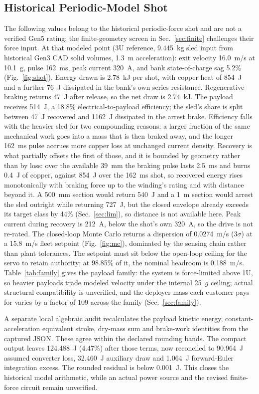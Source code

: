 \documentclass[conference]{IEEEtran}
\begin{document}
\subsection{Historical Periodic-Model Shot}
The following values belong to the historical periodic-force shot and are not a verified Gen5 rating; the finite-geometry screen in Sec.~\ref{sec:finite} challenges their force input. At that modeled point (3U reference, 9.445~kg sled input from historical Gen3 CAD solid volumes, 1.3~m acceleration): exit velocity 16.0~m/s at 10.1~g, pulse 162~ms, peak current 320~A, and bank state-of-charge sag 5.2\% (Fig.~\ref{fig:shot}). Energy drawn is 2.78~kJ per shot, with copper heat of 854~J and a further 76~J dissipated in the bank's own series resistance. Regenerative braking returns 47~J after release, so the net draw is 2.74~kJ. The payload receives 514~J, a 18.8\% electrical-to-payload efficiency; the sled's share is split between 47~J recovered and 1162~J dissipated in the arrest brake. Efficiency falls with the heavier sled for two compounding reasons: a larger fraction of the same mechanical work goes into a mass that is then braked away, and the longer 162~ms pulse accrues more copper loss at unchanged current density. Recovery is what partially offsets the first of those, and it is bounded by geometry rather than by loss: over the available 39~mm the braking pulse lasts 2.5~ms and burns 0.4~J of copper, against 854~J over the 162~ms shot, so recovered energy rises monotonically with braking force up to the winding's rating and with distance beyond it. A 500~mm section would return 540~J and a 1~m section would arrest the sled outright while returning 727~J, but the closed envelope already exceeds its target class by 44\% (Sec.~\ref{sec:lim}), so distance is not available here. Peak current during recovery is 212~A, below the shot's own 320~A, so the drive is not re-rated. The closed-loop Monte Carlo returns a dispersion of 0.0274~m/s (3$\sigma$) at a 15.8~m/s fleet setpoint (Fig.~\ref{fig:mc}), dominated by the sensing chain rather than plant tolerances. The setpoint must sit below the open-loop ceiling for the servo to retain authority; at 98.85\% of it, the nominal headroom is 0.188~m/s. Table~\ref{tab:family} gives the payload family: the system is force-limited above 1U, so heavier payloads trade modeled velocity under the internal 25~$g$ ceiling; actual structural compatibility is unverified, and the deployer mass each customer pays for varies by a factor of 109 across the family (Sec.~\ref{sec:family}).

A separate local algebraic audit recalculates the payload kinetic energy, constant-acceleration equivalent stroke, dry-mass sum and brake-work identities from the captured JSON. These agree within the declared rounding bands. The compact output leaves 124.488~J (4.47\%) after those terms, now reconciled to 90.964~J assumed converter loss, 32.460~J auxiliary draw and 1.064~J forward-Euler integration excess. The rounded residual is below 0.001~J. This closes the historical model arithmetic, while an actual power source and the revised finite-force circuit remain unverified.
\end{document}
